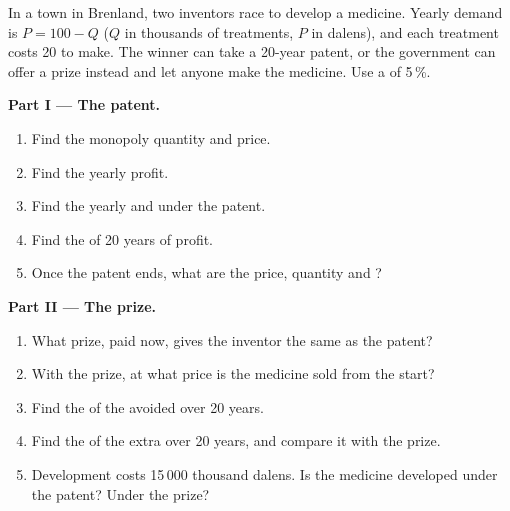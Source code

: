 \begin{problem}
\label{pb:g12:ideas-institutions-growth:1}
In a town in Brenland, two inventors race to develop a medicine. Yearly demand is $P = 100 - Q$ ($Q$ in thousands of treatments, $P$ in dalens), and each treatment costs 20
to make. The winner can take a 20-year patent, or the government can offer a prize instead and let anyone make the medicine. Use a  of 5\,\%.

\medskip
\noindent\textbf{Part I --- The patent.}
\begin{enumerate}
\item Find the monopoly quantity and price.
\item Find the yearly profit.
\item Find the yearly  and  under the patent.
\item Find the  of 20 years of profit.
\item Once the patent ends, what are the price, quantity and ?
\end{enumerate}

\medskip
\noindent\textbf{Part II --- The prize.}
\begin{enumerate}[resume]
\item What prize, paid now, gives the inventor the same  as the patent?
\item With the prize, at what price is the medicine sold from the start?
\item Find the  of the  avoided over 20 years.
\item Find the  of the extra  over 20 years, and compare it with the prize.
\item Development costs 15\,000 thousand dalens. Is the medicine developed under the patent? Under the prize?
\end{enumerate}


\end{problem}
